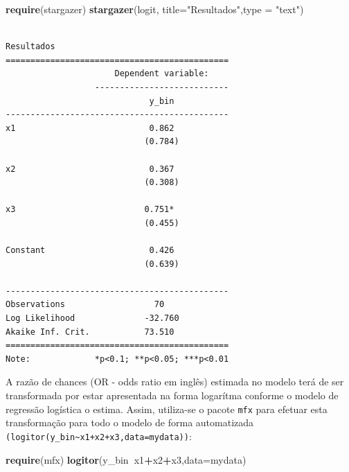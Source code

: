 \documentclass[12pt,brazil,oneside]{book}
\newenvironment{Shaded}{\begin{snugshade}}{\end{snugshade}}
\newcommand{\DataTypeTok}[1]{\textcolor[rgb]{0.13,0.29,0.53}{#1}}
\newcommand{\KeywordTok}[1]{\textcolor[rgb]{0.13,0.29,0.53}{\textbf{#1}}}
\newcommand{\NormalTok}[1]{#1}
\newcommand{\OperatorTok}[1]{\textcolor[rgb]{0.81,0.36,0.00}{\textbf{#1}}}
\newcommand{\StringTok}[1]{\textcolor[rgb]{0.31,0.60,0.02}{#1}}
\begin{document}
\begin{Shaded}
\begin{Highlighting}[]
\KeywordTok{require}\NormalTok{(stargazer)}
\KeywordTok{stargazer}\NormalTok{(logit, }\DataTypeTok{title=}\StringTok{"Resultados"}\NormalTok{,}\DataTypeTok{type =} \StringTok{"text"}\NormalTok{)}
\end{Highlighting}
\end{Shaded}

\begin{verbatim}

Resultados
=============================================
                      Dependent variable:    
                  ---------------------------
                             y_bin           
---------------------------------------------
x1                           0.862           
                            (0.784)          
                                             
x2                           0.367           
                            (0.308)          
                                             
x3                          0.751*           
                            (0.455)          
                                             
Constant                     0.426           
                            (0.639)          
                                             
---------------------------------------------
Observations                  70             
Log Likelihood              -32.760          
Akaike Inf. Crit.           73.510           
=============================================
Note:             *p<0.1; **p<0.05; ***p<0.01
\end{verbatim}

A razão de chances (OR - odds ratio em inglês) estimada no modelo terá
de ser transformada por estar apresentada na forma logarítma conforme o
modelo de regressão logística o estima. Assim, utiliza-se o pacote
\texttt{mfx} para efetuar esta transformação para todo o modelo de forma
automatizada
\texttt{(logitor(y\_bin\textasciitilde{}x1+x2+x3,data=mydata))}:

\begin{Shaded}
\begin{Highlighting}[]
\KeywordTok{require}\NormalTok{(mfx)}
\KeywordTok{logitor}\NormalTok{(y_bin}\OperatorTok{~}\NormalTok{x1}\OperatorTok{+}\NormalTok{x2}\OperatorTok{+}\NormalTok{x3,}\DataTypeTok{data=}\NormalTok{mydata)}
\end{Highlighting}
\end{Shaded}
\end{document}
